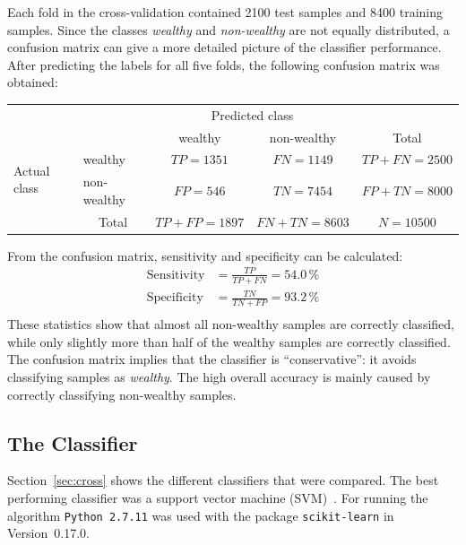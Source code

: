 \documentclass[a4paper,11pt]{article}
\begin{document}
Each fold in the cross-validation contained 2100 test samples and 8400
training samples. Since the classes \emph{wealthy} and
\emph{non-wealthy} are not equally distributed, a confusion matrix can
give a more detailed picture of the classifier performance. After
predicting the labels for all five folds, the following confusion
matrix was obtained:

\begin{table}[h]
\centering
\begin{tabular}{l|l|c|c|c}
\multicolumn{2}{c}{}&\multicolumn{2}{c}{Predicted class}&\\
\cline{3-4}
\multicolumn{2}{c|}{}&wealthy & non-wealthy &\multicolumn{1}{c}{Total}\\
\cline{2-4}
\multirow{2}{*}{Actual class}& wealthy & $TP = 1351$ & $FN = 1149$ & $TP+FN = 2500$\\
\cline{2-4}
& non-wealthy & $FP = 546$ & $TN = 7454$ & $FP+TN = 8000$\\
\cline{2-4}
\multicolumn{1}{c}{} & \multicolumn{1}{c}{Total} & \multicolumn{1}{c}{$TP+FP=1897$} & \multicolumn{1}{c}{$FN+TN = 8603$} & \multicolumn{1}{c}{$N = 10500$}\\
\end{tabular}
\end{table}
From the confusion matrix, sensitivity and specificity can be calculated:
\begin{align}
\text{Sensitivity} &= \frac{TP}{TP + FN} = 54.0\,\%\\
\text{Specificity}    &= \frac{TN}{TN + FP} = 93.2\,\%\\
\end{align}
These statistics show that almost all non-wealthy samples are
correctly classified, while only slightly more than half of the
wealthy samples are correctly classified. The confusion matrix implies
that the classifier is ``conservative'': it avoids classifying samples
as \emph{wealthy}. The high overall accuracy is mainly caused by
correctly classifying non-wealthy samples.

\subsection{The Classifier}

Section~\ref{sec:cross} shows the different classifiers that were
compared. The best performing classifier was a support vector machine
(SVM)~\cite{cortes1995support}. For running the algorithm
\texttt{Python~2.7.11} was used with the package \texttt{scikit-learn}
in Version~0.17.0.
\end{document}
